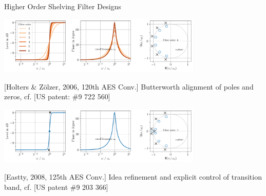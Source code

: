 \documentclass[mathserif,aspectratio=169]{beamer}
\newcommand{\tw}{0.73}
\begin{document}
\begin{frame}{Higher Order Shelving Filter Designs}
\begin{center}
\includegraphics[width=\tw\textwidth]{../graphics/holters2006-higher-order-shelving_slides.pdf}

[Holters \& Z{\"o}lzer, 2006, 120th AES Conv.] Butterworth
alignment of poles and zeros,
cf. [US patent: \#9 722 560]
\end{center}
%
\begin{center}
\includegraphics[width=\tw\textwidth]{../graphics/eastty-BW0.3oct-Gd-11dB_slides.pdf}

[Eastty, 2008, 125th AES Conv.] Idea refinement and explicit control of transition
band, cf. [US patent \#9 203 366]

\end{center}
\end{frame}
%
%
%
\end{document}

